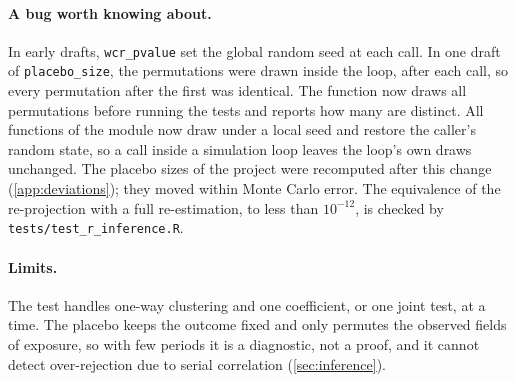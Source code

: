 \paragraph{A bug worth knowing about.} In early drafts, \texttt{wcr\_pvalue} set the global random seed at each call. In one draft of \texttt{placebo\_size}, the permutations were drawn inside the loop, after each call, so every permutation after the first was identical. The function now draws all permutations before running the tests and reports how many are distinct. All functions of the module now draw under a local seed and restore the caller's random state, so a call inside a simulation loop leaves the loop's own draws unchanged. The placebo sizes of the project were recomputed after this change (\cref{app:deviations}); they moved within Monte Carlo error. The equivalence of the re-projection with a full re-estimation, to less than $10^{-12}$, is checked by \texttt{tests/test\_r\_inference.R}.

\paragraph{Limits.} The test handles one-way clustering and one coefficient, or one joint test, at a time. The placebo keeps the outcome fixed and only permutes the observed fields of exposure, so with few periods it is a diagnostic, not a proof, and it cannot detect over-rejection due to serial correlation (\cref{sec:inference}).
